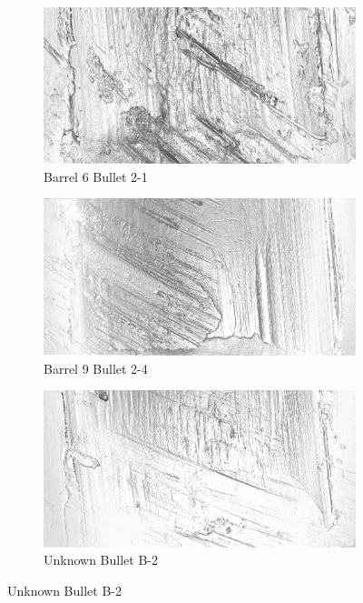 \documentclass[aoas, preprint]{imsart}\usepackage[]{graphicx}\usepackage[]{color}
\begin{document}
\begin{figure}
  \centering
\begin{subfigure}[t]{.49\textwidth}\centering
\caption{Barrel 6 Bullet 2-1}
\includegraphics[width=\textwidth]{br6-2-1-grey.png}
\end{subfigure}
\begin{subfigure}[t]{.49\textwidth}\centering
\caption{Barrel 9 Bullet 2-4}
\includegraphics[width=\textwidth]{br9-2-4-grey.png}
\end{subfigure}
\begin{subfigure}[t]{.49\textwidth}\centering
\caption{Unknown Bullet B-2}
\includegraphics[width=\textwidth]{b-2-grey.png}

\end{subfigure}
\end{figure}
\end{document}
